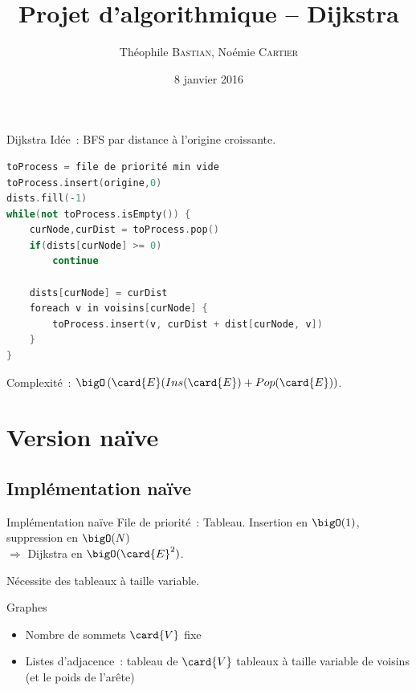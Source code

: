 \documentclass[11pt]{beamer}
\author{Théophile \textsc{Bastian}, Noémie \textsc{Cartier}}
\title{Projet d'algorithmique -- Dijkstra}
\date{8 janvier 2016}
\begin{document}
\begin{frame}
\titlepage
\end{frame}


\begin{frame}[fragile]{Dijkstra}
\alert{Idée~:} BFS par distance à l'origine croissante.

\vspace{1em}
\begin{lstlisting}[language=C++]
toProcess = file de priorité min vide
toProcess.insert(origine,0)
dists.fill(-1)
while(not toProcess.isEmpty()) {
	curNode,curDist = toProcess.pop()
	if(dists[curNode] >= 0)
		continue

	dists[curNode] = curDist
	foreach v in voisins[curNode] {
		toProcess.insert(v, curDist + dist[curNode, v])
	}
}
\end{lstlisting}

\alert{Complexité~:} $\bigO\left(\card{E} (Ins(\card{E}) + Pop(\card{E})\right)$.

\end{frame}

\section{Version naïve}

\subsection{Implémentation naïve}
\begin{frame}{Implémentation naïve}
\alert{File de priorité~:} Tableau. Insertion en $\bigO(1)$, suppression en $\bigO(N)$ \\
\qquad $\Longrightarrow$ Dijkstra en $\bigO(\card{E}^2)$.

\vspace{1em}
Nécessite des \alert{tableaux à taille variable}.

\vspace{1em}
\begin{block}{Graphes}
\begin{itemize}
\item Nombre de sommets $\card{V}$ fixe
\item Listes d'adjacence~: tableau de $\card{V}$ tableaux à taille variable de voisins (et le poids de l'arête)
\end{itemize} 
\end{block}
\end{frame}
\end{document}
